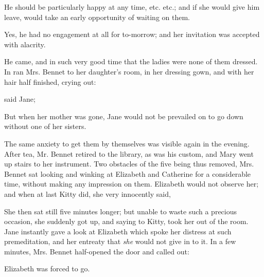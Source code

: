 He should be particularly happy at any time, etc. etc.; and if she would give him leave, would take an early opportunity of waiting on them.


Yes, he had no engagement at all for to-morrow; and her invitation was accepted with alacrity.

He came, and in such very good time that the ladies were none of them dressed. In ran Mrs. Bennet to her daughter's room, in her dressing gown, and with her hair half finished, crying out:


 said Jane; 


But when her mother was gone, Jane would not be prevailed on to go down without one of her sisters.

The same anxiety to get them by themselves was visible again in the evening. After tea, Mr. Bennet retired to the library, as was his custom, and Mary went up stairs to her instrument. Two obstacles of the five being thus removed, Mrs. Bennet sat looking and winking at Elizabeth and Catherine for a considerable time, without making any impression on them. Elizabeth would not observe her; and when at last Kitty did, she very innocently said, 

 She then sat still five minutes longer; but unable to waste such a precious occasion, she suddenly got up, and saying to Kitty,  took her out of the room. Jane instantly gave a look at Elizabeth which spoke her distress at such premeditation, and her entreaty that {\em she} would not give in to it. In a few minutes, Mrs. Bennet half-opened the door and called out:


Elizabeth was forced to go.

